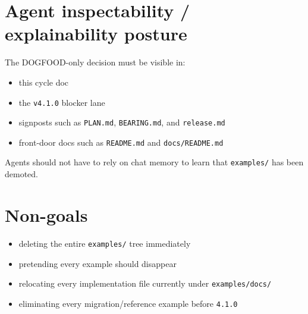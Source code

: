\section{Agent inspectability / explainability posture}\label{record-086-agent-inspectability-explainability-posture}

The DOGFOOD-only decision must be visible in:

\begin{itemize}
\tightlist
\item
  this cycle doc
\item
  the \texttt{v\allowbreak{}4\allowbreak{}.\allowbreak{}1\allowbreak{}.\allowbreak{}0} blocker lane
\item
  signposts such as \texttt{P\allowbreak{}L\allowbreak{}A\allowbreak{}N\allowbreak{}.\allowbreak{}m\allowbreak{}d}, \texttt{B\allowbreak{}E\allowbreak{}A\allowbreak{}R\allowbreak{}I\allowbreak{}N\allowbreak{}G\allowbreak{}.\allowbreak{}m\allowbreak{}d}, and \texttt{r\allowbreak{}e\allowbreak{}l\allowbreak{}e\allowbreak{}a\allowbreak{}s\allowbreak{}e\allowbreak{}.\allowbreak{}m\allowbreak{}d}
\item
  front-door docs such as \texttt{R\allowbreak{}E\allowbreak{}A\allowbreak{}D\allowbreak{}M\allowbreak{}E\allowbreak{}.\allowbreak{}m\allowbreak{}d} and \texttt{d\allowbreak{}o\allowbreak{}c\allowbreak{}s\allowbreak{}/\allowbreak{}R\allowbreak{}E\allowbreak{}A\allowbreak{}D\allowbreak{}M\allowbreak{}E\allowbreak{}.\allowbreak{}m\allowbreak{}d}
\end{itemize}

Agents should not have to rely on chat memory to learn that \texttt{e\allowbreak{}x\allowbreak{}a\allowbreak{}m\allowbreak{}p\allowbreak{}l\allowbreak{}e\allowbreak{}s\allowbreak{}/} has been demoted.

\section{Non-goals}\label{record-086-non-goals}

\begin{itemize}
\tightlist
\item
  deleting the entire \texttt{e\allowbreak{}x\allowbreak{}a\allowbreak{}m\allowbreak{}p\allowbreak{}l\allowbreak{}e\allowbreak{}s\allowbreak{}/} tree immediately
\item
  pretending every example should disappear
\item
  relocating every implementation file currently under \texttt{e\allowbreak{}x\allowbreak{}a\allowbreak{}m\allowbreak{}p\allowbreak{}l\allowbreak{}e\allowbreak{}s\allowbreak{}/\allowbreak{}d\allowbreak{}o\allowbreak{}c\allowbreak{}s\allowbreak{}/}
\item
  eliminating every migration/reference example before \texttt{4\allowbreak{}.\allowbreak{}1\allowbreak{}.\allowbreak{}0}
\end{itemize}

